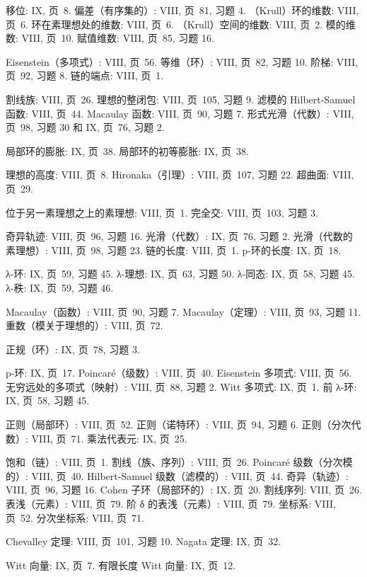 移位: IX, 页~8. 偏差（有序集的）: VIII, 页~81, 习题 4. （Krull）环的维数: VIII, 页~6. 环在素理想处的维数: VIII, 页~6. （Krull）空间的维数: VIII, 页~2. 模的维数: VIII, 页~10. 赋值维数: VIII, 页~85, 习题 16.

Eisenstein（多项式）: VIII, 页~56. 等维（环）: VIII, 页~82, 习题 10. 阶梯: VIII, 页~92, 习题 8. 链的端点: VIII, 页~1.

割线族: VIII, 页~26. 理想的整闭包: VIII, 页~105, 习题 9. 滤模的 Hilbert-Samuel 函数: VIII, 页~44. Macaulay 函数: VIII, 页~90, 习题 7. 形式光滑（代数）: VIII, 页~98, 习题 30 和 IX, 页~76, 习题 2.

局部环的膨胀: IX, 页~38. 局部环的初等膨胀: IX, 页~38.

理想的高度: VIII, 页~8. Hironaka（引理）: VIII, 页~107, 习题 22. 超曲面: VIII, 页~29.

位于另一素理想之上的素理想: VIII, 页~1. 完全交: VIII, 页~103, 习题 3.

奇异轨迹: VIII, 页~96, 习题 16. 光滑（代数）: IX, 页~76, 习题 2. 光滑（代数的素理想）: VIII, 页~98, 习题 23. 链的长度: VIII, 页~1. p-环的长度: IX, 页~18.

λ-环: IX, 页~59, 习题 45. λ-理想: IX, 页~63, 习题 50. λ-同态: IX, 页~58, 习题 45. λ-秩: IX, 页~59, 习题 46.

Macaulay（函数）: VIII, 页~90, 习题 7. Macaulay（定理）: VIII, 页~93, 习题 11. 重数（模关于理想的）: VIII, 页~72.

正规（环）: IX, 页~78, 习题 3.

p-环: IX, 页~17. Poincaré（级数）: VIII, 页~40. Eisenstein 多项式: VIII, 页~56. 无穷远处的多项式（映射）: VIII, 页~88, 习题 2. Witt 多项式: IX, 页~1. 前 λ-环: IX, 页~58, 习题 45.

正则（局部环）: VIII, 页~52. 正则（诺特环）: VIII, 页~94, 习题 6. 正则（分次代数）: VIII, 页~71. 乘法代表元: IX, 页~25.

饱和（链）: VIII, 页~1. 割线（族、序列）: VIII, 页~26. Poincaré 级数（分次模的）: VIII, 页~40. Hilbert-Samuel 级数（滤模的）: VIII, 页~44. 奇异（轨迹）: VIII, 页~96, 习题 16. Cohen 子环（局部环的）: IX, 页~20. 割线序列: VIII, 页~26. 表浅（元素）: VIII, 页~79. 阶 δ 的表浅（元素）: VIII, 页~79. 坐标系: VIII, 页~52. 分次坐标系: VIII, 页~71.

Chevalley 定理: VIII, 页~101, 习题 10. Nagata 定理: IX, 页~32.

Witt 向量: IX, 页~7. 有限长度 Witt 向量: IX, 页~12.

